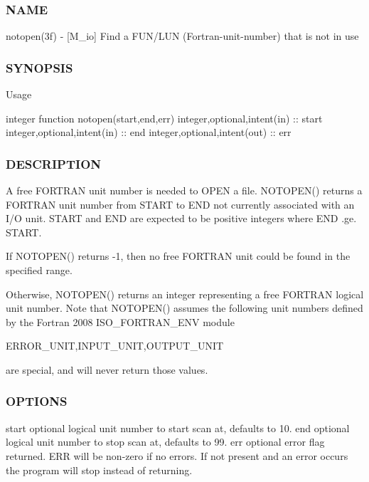 \subsubsection*{N\+A\+ME}

notopen(3f) -\/ \mbox{[}M\+\_\+io\mbox{]} Find a F\+U\+N/\+L\+UN (Fortran-\/unit-\/number) that is not in use \subsubsection*{S\+Y\+N\+O\+P\+S\+IS}

Usage

integer function notopen(start,end,err) integer,optional,intent(in) \+:\+: start integer,optional,intent(in) \+:\+: end integer,optional,intent(out) \+:\+: err \subsubsection*{D\+E\+S\+C\+R\+I\+P\+T\+I\+ON}

A free F\+O\+R\+T\+R\+AN unit number is needed to O\+P\+EN a file. N\+O\+T\+O\+P\+E\+N() returns a F\+O\+R\+T\+R\+AN unit number from S\+T\+A\+RT to E\+ND not currently associated with an I/O unit. S\+T\+A\+RT and E\+ND are expected to be positive integers where E\+ND .ge. S\+T\+A\+RT.

If N\+O\+T\+O\+P\+E\+N() returns -\/1, then no free F\+O\+R\+T\+R\+AN unit could be found in the specified range.

Otherwise, N\+O\+T\+O\+P\+E\+N() returns an integer representing a free F\+O\+R\+T\+R\+AN logical unit number. Note that N\+O\+T\+O\+P\+E\+N() assumes the following unit numbers defined by the Fortran 2008 I\+S\+O\+\_\+\+F\+O\+R\+T\+R\+A\+N\+\_\+\+E\+NV module

E\+R\+R\+O\+R\+\_\+\+U\+N\+IT,I\+N\+P\+U\+T\+\_\+\+U\+N\+IT,O\+U\+T\+P\+U\+T\+\_\+\+U\+N\+IT

are special, and will never return those values.

\subsubsection*{O\+P\+T\+I\+O\+NS}

start optional logical unit number to start scan at, defaults to 10. end optional logical unit number to stop scan at, defaults to 99. err optional error flag returned. E\+RR will be non-\/zero if no errors. If not present and an error occurs the program will stop instead of returning.

